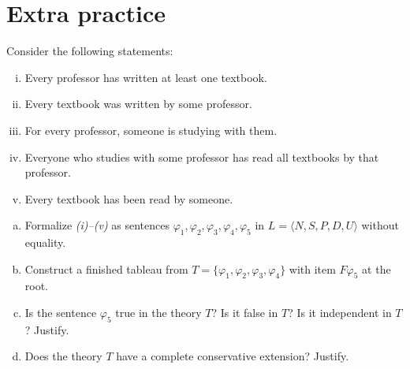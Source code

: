\section*{Extra practice}


\begin{problem}
    
    Consider the following statements:
    \begin{enumerate}[(i)]\it
        \item Every professor has written at least one textbook.
        \item Every textbook was written by some professor.
        \item For every professor, someone is studying with them.
        \item Everyone who studies with some professor has read all textbooks by that professor.
        \item Every textbook has been read by someone.
    \end{enumerate}    
    \begin{enumerate}[(a)]
        \item Formalize {\it(i)--(v)} as sentences $\varphi_1,\varphi_2,\varphi_3,\varphi_4,\varphi_5$ in $L=\langle N, S, P, D, U\rangle$ without equality.
        \item Construct a finished tableau from $T=\{\varphi_1,\varphi_2,\varphi_3,\varphi_4\}$ with item $F\varphi_5$ at the root.
        \item Is the sentence $\varphi_5$ true in the theory $T$? Is it false in $T$? Is it independent in $T$? Justify.
        \item Does the theory $T$ have a complete conservative extension? Justify.
    \end{enumerate}

\end{problem}



